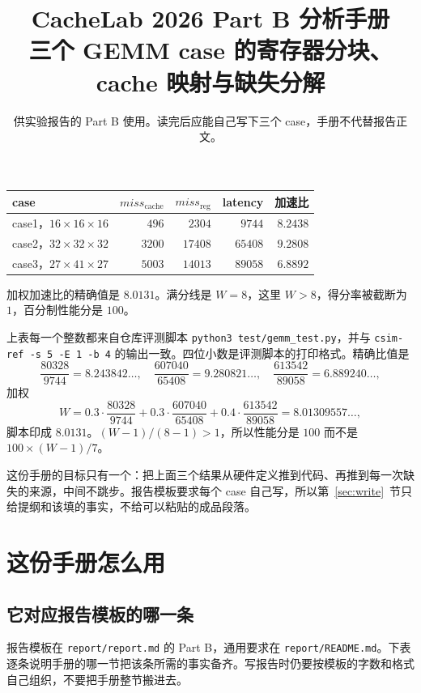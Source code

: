 \documentclass[11pt,a4paper,fontset=fandol]{ctexart}
\title{\textbf{CacheLab 2026 Part B 分析手册}\\[0.4em]
\large 三个 GEMM case 的寄存器分块、cache 映射与缺失分解}
\author{供实验报告的 Part B 使用。读完后应能自己写下三个 case，手册不代替报告正文。}
\date{}
\newcommand{\code}[1]{\texttt{#1}}
\newcommand{\mreg}{\mathit{miss}_{\mathrm{reg}}}
\newcommand{\mc}{\mathit{miss}_{\mathrm{cache}}}
\begin{document}
\maketitle
\thispagestyle{fancy}

\begin{center}
\small
\setlength{\tabcolsep}{5pt}
\begin{tabular}{@{}lrrrr@{}}
\toprule
case & $\mc$ & $\mreg$ & latency & 加速比\\
\midrule
case1，$16\times16\times16$ & $496$ & $2304$ & $9744$ & $8.2438$\\
case2，$32\times32\times32$ & $3200$ & $17408$ & $65408$ & $9.2808$\\
case3，$27\times41\times27$ & $5003$ & $14013$ & $89058$ & $6.8892$\\
\bottomrule
\end{tabular}
\end{center}

\noindent 加权加速比的精确值是 $8.0131$。满分线是 $W=8$，这里 $W>8$，得分率被截断为 $1$，百分制性能分是 $100$。

\noindent 上表每一个整数都来自仓库评测脚本 \code{python3 test/gemm\_test.py}，并与 \code{csim-ref -s 5 -E 1 -b 4} 的输出一致。四位小数是评测脚本的打印格式。精确比值是
\[
\frac{80328}{9744}=8.243842\ldots,\quad
\frac{607040}{65408}=9.280821\ldots,\quad
\frac{613542}{89058}=6.889240\ldots,
\]
加权
\[
W=0.3\cdot\frac{80328}{9744}+0.3\cdot\frac{607040}{65408}+0.4\cdot\frac{613542}{89058}=8.01309557\ldots,
\]
脚本印成 $8.0131$。$(W-1)/(8-1)>1$，所以性能分是 $100$ 而不是 $100\times(W-1)/7$。

这份手册的目标只有一个：把上面三个结果从硬件定义推到代码、再推到每一次缺失的来源，中间不跳步。报告模板要求每个 case 自己写，所以第~\ref{sec:write}~节只给提纲和该填的事实，不给可以粘贴的成品段落。

\tableofcontents
\newpage

\section{这份手册怎么用}
\label{sec:how}

\subsection{它对应报告模板的哪一条}

报告模板在 \code{report/report.md} 的 Part B，通用要求在 \code{report/README.md}。下表逐条说明手册的哪一节把该条所需的事实备齐。写报告时仍要按模板的字数和格式自己组织，不要把手册整节搬进去。
\end{document}
